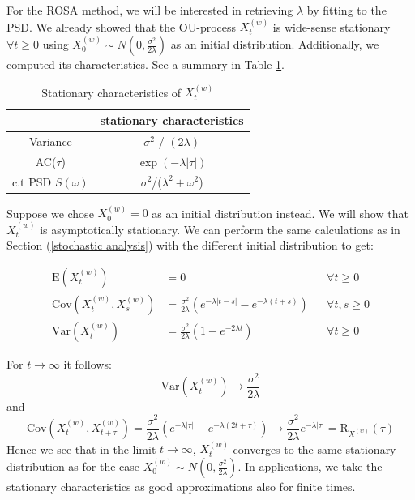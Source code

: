 \documentclass[%
thesis=student,%
coverpage=false,%
titlepage=false,%
headmarks=true, %
english,%
font=libertine, %
math=newpxtx, %
BCOR=5mm,%
coverBCOR=11mm%
]{tumbook}
\begin{document}
For the ROSA method, we will be interested in retrieving $\lambda$ by fitting to the PSD. We already showed that the OU-process $X_{t}^{(w)}$ is wide-sense stationary $\forall t \geq 0$ using $X_{0}^{(w)} \sim N(0,\frac{\sigma^2}{2\lambda})$ as an initial distribution. Additionally, we computed its characteristics. See a summary in Table \ref{tab:white_noise_stat_char}. 


\begin{table}[t]
\centering
\begin{tabular}{|c|c|}
\hline
& stationary characteristics\\
\hline
Variance & $\sigma^2$ / $(2\lambda)$\\
AC($\tau$) & $\exp(-\lambda |\tau|)$\\
c.t PSD $S(\omega)$ & $\sigma^2$/($\lambda^2 + \omega^2$)\\
\hline
\end{tabular}
\caption{Stationary characteristics of $X_{t}^{(w)}$}
\label{tab:white_noise_stat_char}
\end{table}

Suppose we chose $X_{0}^{(w)} = 0$ as an initial distribution instead. We will show that $X_{t}^{(w)}$ is asymptotically stationary. We can perform the same calculations as in Section (\ref{stochastic analysis}) with the different initial distribution to get:

 \begin{align*}
    \mathrm{E}(X_{t}^{(w)}) &= 0   && \forall t \geq 0 \\
    \mathrm{Cov}(X_{t}^{(w)},X_{s}^{(w)}) &= \frac{\sigma ^2}{2\lambda}(e^{-\lambda\lvert t-s \rvert}-e^{-\lambda(t+s)}) && \forall t, s \geq 0 \\
    \mathrm{Var}(X_{t}^{(w)}) &= \frac{\sigma^2}{2\lambda}(1-e^{-2\lambda t}) && \forall t \geq 0 
\end{align*}

For $t\rightarrow \infty$ it follows: 
\[
\mathrm{Var}(X_{t}^{(w)})\rightarrow\frac{\sigma^2}{2\lambda}
\]
and 
\[
\text{Cov}(X_{t}^{(w)},X_{t+\tau}^{(w)}) = \frac{\sigma^2}{2\lambda}(e^{-\lambda\lvert \tau \rvert} - e^{-\lambda(2t + \tau)}) \rightarrow \frac{\sigma ^2}{2\lambda}e^{-\lambda\lvert \tau \rvert} = \mathrm{R}_{X^{(w)}}(\tau)
\]
Hence we see that in the limit $t\rightarrow \infty$, $X_{t}^{(w)}$ converges to the same stationary distribution as for the case $X_{0}^{(w)} \sim N(0,\frac{\sigma^2}{2\lambda})$. 
In applications, we take the stationary characteristics as good approximations also for finite times.
\end{document}
